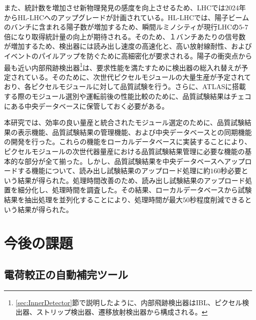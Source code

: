 また、統計数を増加させ新物理発見の感度を向上させるため、LHCでは2024年からHL-LHCへのアップグレードが計画されている。HL-LHCでは、陽子ビームのバンチに含まれる陽子数が増加するため、瞬間ルミノシティが現行LHCの$5$-$7$倍になり取得統計量の向上が期待される。そのため、１バンチあたりの信号数が増加するため、検出器には読み出し速度の高速化と、高い放射線耐性、およびイベントのパイルアップを防ぐために高細密化が要求される。陽子の衝突点から最も近い内部飛跡検出器\footnote{\ref{sec:InnerDetector}節で説明したように、内部飛跡検出器はIBL、ピクセル検出器、ストリップ検出器、遷移放射検出器から構成される。}は、要求性能を満たすために検出器の総入れ替えが予定されている。そのために、次世代ピクセルモジュールの大量生産が予定されており、各ピクセルモジュールに対して品質試験を行う。さらに、ATLASに搭載する際のモジュール選別や運転前後の性能比較のために、品質試験結果はチェコにある中央データベースに保管しておく必要がある。

本研究では、効率の良い量産と統合されたモジュール選定のために、品質試験結果の表示機能、品質試験結果の管理機能、および中央データベースとの同期機能の開発を行った。これらの機能をローカルデータベースに実装することにより、ピクセルモジュールの次世代器量産における品質試験結果管理に必要な機能の基本的な部分が全て揃った。しかし、品質試験結果を中央データベースへアップロードする機能について、読み出し試験結果のアップロード処理に約$160$秒必要という結果が得られた。処理時間改善のため、読み出し試験結果のアップロード処置を細分化し、処理時間を調査した。その結果、ローカルデータベースから試験結果を抽出処理を並列化することにより、処理時間が最大$50$秒程度削減できるという結果が得られた。


\section{今後の課題}
\label{sec:konngonokadai}

\subsection{電荷較正の自動補完ツール}
\label{sec:dennkahoseinokonngonokadai}

